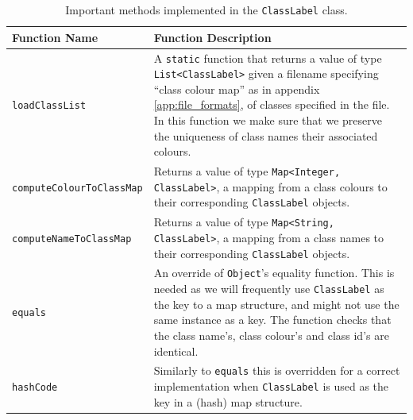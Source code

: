 \documentclass[12pt,twoside,notitlepage]{report}
\begin{document}
                \begin{table}[H]
                    \begin{tabularx}{\textwidth}{l|X}
                        \textbf{Function Name} & \textbf{Function Description} \\
                        \hline

                        \texttt{loadClassList} & 
                            A \texttt{static} function that returns a value of type \texttt{List<ClassLabel>} given a 
                            filename specifying ``class colour map'' as in appendix \ref{app:file_formats}, of classes 
                            specified in the file. In this function we make sure that we preserve the uniqueness of 
                            class names their associated colours. \\
                        \hline

                        \texttt{computeColourToClassMap} & 
                            Returns a value of type \texttt{Map<Integer, ClassLabel>}, a mapping from a class colours to 
                            their corresponding \texttt{ClassLabel} objects. \\ 
                        \hline

                        \texttt{computeNameToClassMap} & 
                            Returns a value of type \texttt{Map<String, ClassLabel>}, a mapping from a class names to 
                            their corresponding \texttt{ClassLabel} objects. \\
                        \hline

                        \texttt{equals} &
                            An override of \texttt{Object}'s equality function. This is needed as we will frequently 
                            use \texttt{ClassLabel} as the key to a map structure, and might not use the same instance 
                            as a key. The function checks that the class name's, class colour's and class id's are 
                            identical. \\
                        \hline

                        \texttt{hashCode} &
                            Similarly to \texttt{equals} this is overridden for a correct implementation when 
                            \texttt{ClassLabel} is used as the key in a (hash) map structure.

                    \end{tabularx}
                    \caption{Important methods implemented in the \texttt{ClassLabel} class.}
                    \label{tab:ClassLabel}
                \end{table}
\end{document}
